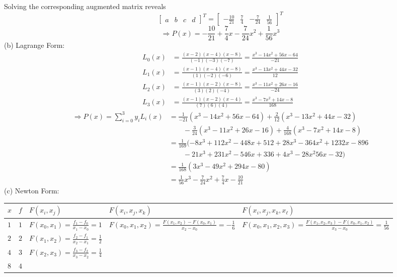 \documentclass[11pt]{article}
\theoremstyle{definition}
\newcommand{\1}[1]{\mathbf{1} \left \{ #1 \right \}}
\begin{document}
Solving the corresponding augmented matrix reveals
\[\begin{bmatrix} a & b & c & d \end{bmatrix}^T = \begin{bmatrix} -\frac{10}{21} & \frac{7}{4} & -\frac{7}{24} & \frac{1}{56} \end{bmatrix}^T\]
\[\Longrightarrow P(x) = -\frac{10}{21} + \frac{7}{4}x - \frac{7}{24}x^2 + \frac{1}{56}x^3\]
(b) Lagrange Form:
\begin{equation*}
    \begin{split}
        L_0 (x) &= \frac{(x-2)(x-4)(x-8)}{(-1)(-3)(-7)} = \frac{x^3 - 14x^2 + 56x - 64}{-21} \\
        L_1 (x) &= \frac{(x-1)(x-4)(x-8)}{(1)(-2)(-6)} = \frac{x^3 - 13x^2 + 44x - 32}{12} \\
        L_2 (x) &= \frac{(x-1)(x-2)(x-8)}{(3)(2)(-4)} = \frac{x^3 - 11x^2 + 26x - 16}{-24} \\
        L_3 (x) &= \frac{(x-1)(x-2)(x-4)}{(7)(6)(4)} = \frac{x^3 - 7x^2 + 14x - 8}{168}
    \end{split}
\end{equation*}
\begin{equation*}
    \begin{split}
        \Longrightarrow P(x) = \sum_{i=0}^3 y_i L_i (x) &= \frac{1}{-21}(x^3 - 14x^2 + 56x - 64) + \frac{2}{12}(x^3 - 13x^2 + 44x - 32) \\ & \qquad - \frac{3}{24}(x^3 - 11x^2 + 26x - 16) + \frac{4}{168}(x^3 - 7x^2 + 14x - 8) \\
        &= \frac{1}{169}(-8x^3 + 112x^2 - 448x + 512 + 28x^3 - 364x^2 + 1232x - 896 \\
        & \qquad - 21x^3 + 231x^2 - 546x + 336 + 4x^3 - 28x^2 56x - 32) \\
        &= \frac{1}{168}(3x^3 - 49x^2 + 294x - 80) \\
        &= \frac{1}{56}x^3 - \frac{7}{24}x^2 + \frac{7}{4}x - \frac{10}{21}
    \end{split}
\end{equation*}
(c) Newton Form:
\begin{center}
\begin{tabular}{ |p{0.1cm}|p{0.1cm}|p{2cm}|p{3cm}|p{4cm}| }
\hline
$x$ & $f$ & \(F(x_i , x_j)\) & \(F(x_i , x_j , x_k)\) & \(F(x_i , x_j , x_k , x_{\ell})\) \\
\hline
$1$ & $1$ & \(F(x_0 , x_1) = \frac{f_1 - f_0}{x_1 - x_0} = 1\) & \multirow{3}{6em}{\(F(x_0 , x_1 , x_2) = \frac{F(x_1 , x_2) - F(x_0 , x_1)}{x_2 - x_0} = -\frac{1}{6}\)} & \multirow{4}{6em}{\(F(x_0 , x_1 , x_2 , x_3) = \frac{F(x_1 , x_2 , x_3) - F(x_0 , x_1 , x_2)}{x_3 - x_0} = \frac{1}{56}\)} \\
$2$ & $2$ & \(F(x_1 , x_2) = \frac{f_2 - f_1}{x_2 - x_1} = \frac{1}{2}\) & \multirow{5}{10em}{\(F(x_1 , x_2 , x_3) = \frac{F(x_2 , x_3) - F(x_1 , x_2)}{x_3 - x_1} = -\frac{1}{24}\)} &   \\
$4$ & $3$ & \(F(x_2 , x_3) = \frac{f_3 - f_2}{x_3 - x_2} = \frac{1}{4}\) &   &\\
$8$ & $4$ &   &   &\\
\hline
\end{tabular}
\end{center}
\end{document}
